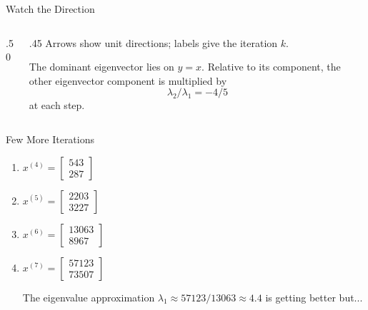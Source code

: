 \documentclass[10pt]{beamer}
\begin{document}
\begin{frame}{Watch the Direction}
\begin{columns}[c]
\begin{column}{.50\textwidth}
\centering
{}
\end{column}
\begin{column}{.45\textwidth}
Arrows show unit directions; labels give the iteration $k$.

\medskip
The dominant eigenvector lies on $y=x$. Relative to its component, the other eigenvector component is multiplied by
\[
\lambda_2/\lambda_1=-4/5
\]
at each step.
\end{column}
\end{columns}
\end{frame}




\begin{frame}{Few More Iterations}

\begin{enumerate}
    \item $x^{(4)} = \begin{bmatrix} 543\\287\end{bmatrix}$
    
    \item $x^{(5)} = \begin{bmatrix} 2203\\3227\end{bmatrix}$
    
    \item $x^{(6)} = \begin{bmatrix} 13063\\8967\end{bmatrix}$
    
    \item $x^{(7)} = \begin{bmatrix} 57123\\73507\end{bmatrix}$
        \vfill
    \begin{center}
        The eigenvalue approximation $\lambda_1\approx 57123/13063\approx 4.4$ is getting better but...
    \end{center}
    
\end{enumerate}
    
\end{frame}
\end{document}
